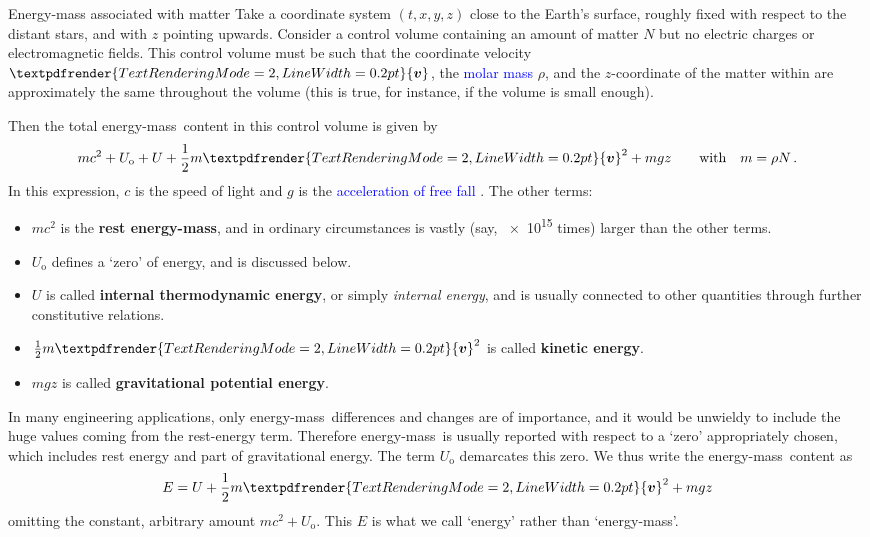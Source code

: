 \documentclass[a4paper,12pt,%
onecolumn,oneside,%
british%
]{memoir}
\renewcommand*{\bm}[1]{\textpdfrender{TextRenderingMode=2,LineWidth=0.2pt}{\boldsymbol{#1}}}
\renewcommand*{\|}[1][]{\nonscript\:#1\vert\nonscript\:\mathopen{}}
\newcommand*{\sect}{\S}%
\renewcommand*{\autoref}[3][\sect\,\ref]{\textcolor{blue}{#3}
\raisebox{0.6ex}{\color{blue}\miniscule%
\faIcon{angle-right}%
\;#1{#2}\;p.\,\pageref{#2}}}
\newcommand*{\energym}{energy-mass}
\newcommand*{\yc}{c} %
\newcommand*{\yv}{\bm{v}}
\newcommand*{\yN}{N}
\newcommand*{\yrho}{\rho}
\newcommand*{\ym}{m}%
\newcommand*{\yE}{E}
\newcommand*{\yU}{U}
\newcommand*{\yUo}{\yU_{\textrm{o}}}
\begin{document}
\begin{definition}{Energy-mass associated with matter}\label{def:energy_volume_matter}
  Take a coordinate system $(t,x,y,z)$ close to the Earth's surface, roughly fixed with respect to the distant stars, and with $z$ pointing upwards. Consider a control volume containing an amount of matter $\yN$ but no electric charges or electromagnetic fields. This control volume must be such that the coordinate velocity $\yv$, the \autoref{def:molarmass}{molar mass} $\yrho$, and the $z$-coordinate of the matter within are approximately the same throughout the volume (this is true, for instance, if the volume is small enough).

  \smallskip

  Then the total \energym\ content in this control volume is given by
  \begin{equation}
    \label{eq:energy_volume_matter}
    \ym \yc^{2} +  \yUo + \yU + \frac{1}{2}\ym \yv^{2} + \ym g z
    \qquad\text{with}\quad \ym = \yrho\yN \,.
  \end{equation}
  In this expression, $\yc$ is the speed of light and $g$ is the \autoref{sec:supply_momentum_gravity}{acceleration of free fall}. %
  The other terms:
  \begin{itemize}
  \item $\ym \yc^{2}$ is the \textbf{rest \energym}, and in ordinary circumstances is vastly (say, \num{e15} times) larger than the other terms.

  \item $\yUo$ defines a \enquote*{zero} of energy, and is discussed below.
    
  \item $\yU$ is called \textbf{internal thermodynamic energy}, or simply \emph{internal energy}, and is usually connected to other quantities through further constitutive relations.

  \item $\frac{1}{2}\ym \yv^{2}$ is called \textbf{kinetic energy}.

  \item $\ym g z$ is called \textbf{gravitational potential energy}.
  \end{itemize}

  \medskip

  In many engineering applications, only \energym\ differences and changes are of importance, and it would be unwieldy to include the huge values coming from the rest-energy term. Therefore \energym\ is usually reported with respect to a \enquote*{zero} appropriately chosen, which includes rest energy and part of gravitational energy. The term $\yUo$ demarcates this zero. We thus write the \energym\ content as
  \begin{equation}
    \label{eq:thermodynamic_energy}
    \yE = \yU + \frac{1}{2}\ym \yv^{2} + \ym g z
  \end{equation}
  omitting the constant, arbitrary amount $\ym\yc^{2} + \yUo$. This $\yE$ is what we call \enquote*{energy} rather than \enquote*{\energym}.
\end{definition}
\end{document}
